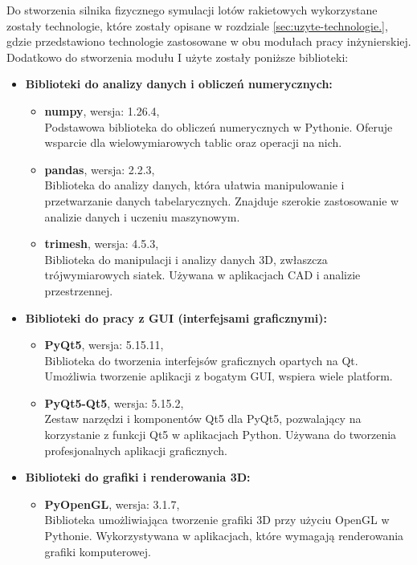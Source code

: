Do stworzenia silnika fizycznego symulacji lotów rakietowych wykorzystane
zostały technologie, które zostały opisane w rozdziale
\ref{sec:uzyte-technologie.}, gdzie przedstawiono technologie zastosowane
w obu modułach pracy inżynierskiej.\\
Dodatkowo do stworzenia modułu I użyte zostały poniższe biblioteki:

\begin{itemize}
    \item \textbf{Biblioteki do analizy danych i obliczeń numerycznych:}
    \begin{itemize}
        \item \textbf{numpy}, wersja: 1.26.4, \\
        Podstawowa biblioteka do obliczeń numerycznych w Pythonie. Oferuje wsparcie dla wielowymiarowych tablic oraz operacji na nich.

        \item \textbf{pandas}, wersja: 2.2.3, \\
        Biblioteka do analizy danych, która ułatwia manipulowanie i przetwarzanie danych tabelarycznych. Znajduje szerokie zastosowanie w analizie danych i uczeniu maszynowym.

        \item \textbf{trimesh}, wersja: 4.5.3, \\
        Biblioteka do manipulacji i analizy danych 3D, zwłaszcza trójwymiarowych siatek. Używana w aplikacjach CAD i analizie przestrzennej.
    \end{itemize}

    \item \textbf{Biblioteki do pracy z GUI (interfejsami graficznymi):}
    \begin{itemize}
        \item \textbf{PyQt5}, wersja: 5.15.11, \\
        Biblioteka do tworzenia interfejsów graficznych opartych na Qt. Umożliwia tworzenie aplikacji z bogatym GUI, wspiera wiele platform.

        \item \textbf{PyQt5-Qt5}, wersja: 5.15.2, \\
        Zestaw narzędzi i komponentów Qt5 dla PyQt5, pozwalający na korzystanie z funkcji Qt5 w aplikacjach Python. Używana do tworzenia profesjonalnych aplikacji graficznych.
    \end{itemize}


    \item \textbf{Biblioteki do grafiki i renderowania 3D:}
    \begin{itemize}
        \item \textbf{PyOpenGL}, wersja: 3.1.7, \\
        Biblioteka umożliwiająca tworzenie grafiki 3D przy użyciu OpenGL w Pythonie. Wykorzystywana w aplikacjach, które wymagają renderowania grafiki komputerowej.


\end{itemize}
\end{itemize}
